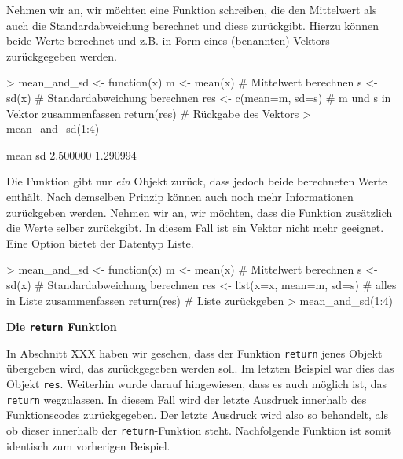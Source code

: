 \documentclass[12pt, a4paper,twoside,openany,x11names,svgnames]{memoir}
\begin{document}
Nehmen wir an, wir möchten eine Funktion schreiben, die den Mittelwert als auch die Standardabweichung berechnet und diese zurückgibt. Hierzu können beide Werte berechnet und z.B. in Form eines (benannten) Vektors zurückgegeben werden.

\begin{Schunk}
\begin{Sinput}
> mean_and_sd <- function(x) {
   m <- mean(x)                      # Mittelwert berechnen
   s <- sd(x)                        # Standardabweichung berechnen
   res <- c(mean=m, sd=s)            # m und s in Vektor zusammenfassen
   return(res)                       # Rückgabe des Vektors
 }
> mean_and_sd(1:4)
\end{Sinput}
\begin{Soutput}
    mean       sd 
2.500000 1.290994 
\end{Soutput}
\end{Schunk}

Die Funktion gibt nur \emph{ein} Objekt zurück, dass jedoch beide berechneten Werte enthält. Nach demselben Prinzip können auch noch mehr Informationen zurückgeben werden. Nehmen wir an, wir möchten, dass die Funktion zusätzlich die Werte selber zurückgibt. In diesem Fall ist ein Vektor nicht mehr geeignet. Eine Option bietet der Datentyp Liste. 

\begin{Schunk}
\begin{Sinput}
> mean_and_sd <- function(x) {
   m <- mean(x)                      # Mittelwert berechnen
   s <- sd(x)                        # Standardabweichung berechnen
   res <- list(x=x, mean=m, sd=s)    # alles in Liste zusammenfassen
   return(res)                       # Liste zurückgeben
 }
> mean_and_sd(1:4)
\end{Sinput}
\end{Schunk}

\vspace*{5mm}

\textbf{Die \texttt{return} Funktion}

In Abschnitt XXX haben wir gesehen, dass der Funktion \texttt{return} jenes Objekt übergeben wird, das zurückgegeben werden soll. Im letzten Beispiel war dies das Objekt \texttt{res}. Weiterhin wurde darauf hingewiesen, dass es auch möglich ist, das \texttt{return} wegzulassen. In diesem Fall wird der letzte Ausdruck innerhalb des Funktionscodes zurückgegeben. Der letzte Ausdruck wird also so behandelt, als ob dieser innerhalb der \texttt{return}-Funktion steht. Nachfolgende Funktion ist somit identisch zum vorherigen Beispiel.
\end{document}
